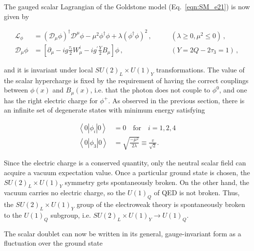 The gauged scalar Lagrangian of the Goldstone model (Eq.~\ref{eqn:SM_e21}) is now given by

\begin{equation}\label{eqn:SM_e27}
\begin{aligned}
\mathcal{L}_\phi  & = (\mathcal{D}_\mu\phi)^\dag\mathcal{D}^\mu\phi - \mu^2\phi^\dag\phi + \lambda(\phi^\dag\phi)^2 \, , & \qquad (\lambda \geq 0, \mu^2 \leq 0) \, , \\
 \mathcal{D}_\mu\phi & =  [\partial_\mu - ig\frac{\tau_i}{2}W_\mu^i - ig^\prime\frac{Y}{2}B_\mu]\phi \, , & \qquad (Y = 2Q - 2\tau_3 = 1) \, , 
\end{aligned}
\end{equation}

\noindent and it is invariant under local $SU(2)_L \times U(1)_Y$ transformations.
The value of the scalar hypercharge is fixed by the requirement of having the correct couplings between $\phi(x)$ and $B_\mu(x)$, i.e. that the photon does not couple to $\phi^0$, and one has the right electric charge for $\phi^+$.
As observed in the previous section, there is an infinite set of degenerate states with minimum energy satisfying

\begin{equation}\label{eqn:SM_e29}
\begin{aligned}
\left\langle0|\phi_i|0\right\rangle & = 0 \quad \mbox{for} \quad i = 1,2,4\\
\left\langle0|\phi_3|0\right\rangle & = \sqrt{\frac{-\mu^2}{2\lambda}} \equiv \frac{v}{\sqrt{2}}.
\end{aligned}
\end{equation}

Since the electric charge is a conserved quantity, only the neutral scalar field can acquire a vacuum expectation value.
Once a particular ground state is chosen, the $SU(2)_L\times U(1)_Y$ symmetry gets spontaneously broken.
On the other hand, the vacuum carries no electric charge, so the $U(1)_{Q}$ of QED is not broken.
Thus, the $SU(2)_L\times U(1)_Y$ group of the electroweak theory is spontaneously broken to the $U(1)_{Q}$ subgroup, i.e. $SU(2)_L \times U(1)_Y \rightarrow U(1)_Q$.

The scalar doublet can now be written in its general, gauge-invariant form as a fluctuation over the ground state


